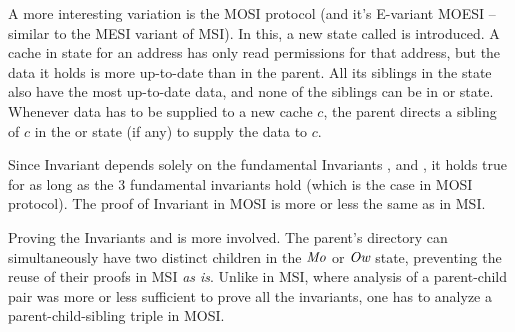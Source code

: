 A more interesting variation is the MOSI protocol (and it's E-variant MOESI --
similar to the MESI variant of MSI). In this, a new state called \Ow{} is
introduced. A cache in \Ow{} state for an address has only read permissions for
that address, but the data it holds is more up-to-date than in the parent.  All
its siblings in the \Sh{} state also have the most up-to-date data, and none of
the siblings can be in \Mo{} or \Ow{} state.  Whenever data has to be supplied
to a new cache $c$, the parent directs a sibling of $c$ in the \Ow{} or \Mo{}
state (if any) to supply the data to $c$.

Since Invariant  depends solely on the fundamental Invariants
,  and , it holds true
for as long as the 3 fundamental invariants hold (which is the case in MOSI
protocol). The proof of Invariant  in MOSI is more
or less the same as in MSI.

Proving the Invariants  and
 is more involved. The parent's directory can
simultaneously have two distinct children in the $\textit{Mo}$ or $\textit{Ow}$ state,
preventing the reuse of their proofs in MSI \emph{as is}. Unlike in MSI, where
analysis of a parent-child pair was more or less sufficient to prove all the
invariants, one has to analyze a parent-child-sibling triple in MOSI.


